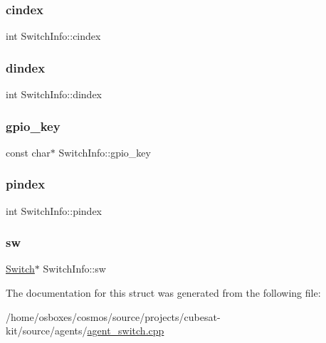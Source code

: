 \subsubsection{\texorpdfstring{cindex}{cindex}}
{\footnotesize\ttfamily int Switch\+Info\+::cindex}

\mbox{\label{structSwitchInfo_a31bbae800a9455b20607c285e3dd5771}} 
\subsubsection{\texorpdfstring{dindex}{dindex}}
{\footnotesize\ttfamily int Switch\+Info\+::dindex}

\mbox{\label{structSwitchInfo_a551cba470dd89e95902f84cef26b0412}} 
\subsubsection{\texorpdfstring{gpio\+\_\+key}{gpio\_key}}
{\footnotesize\ttfamily const char$\ast$ Switch\+Info\+::gpio\+\_\+key}

\mbox{\label{structSwitchInfo_a60a1adfd5341d6514573d589a25b8e5f}} 
\subsubsection{\texorpdfstring{pindex}{pindex}}
{\footnotesize\ttfamily int Switch\+Info\+::pindex}

\mbox{\label{structSwitchInfo_a46a40920c06b4de39f14020d0dd5ba35}} 
\subsubsection{\texorpdfstring{sw}{sw}}
{\footnotesize\ttfamily \hyperlink{namespacecubesat_ac3cec22ee304129611eb1001b0fc5824}{Switch}$\ast$ Switch\+Info\+::sw}



The documentation for this struct was generated from the following file\+:\begin{DoxyCompactItemize}
\item 
/home/osboxes/cosmos/source/projects/cubesat-\/kit/source/agents/\hyperlink{agent__switch_8cpp}{agent\+\_\+switch.\+cpp}\end{DoxyCompactItemize}
